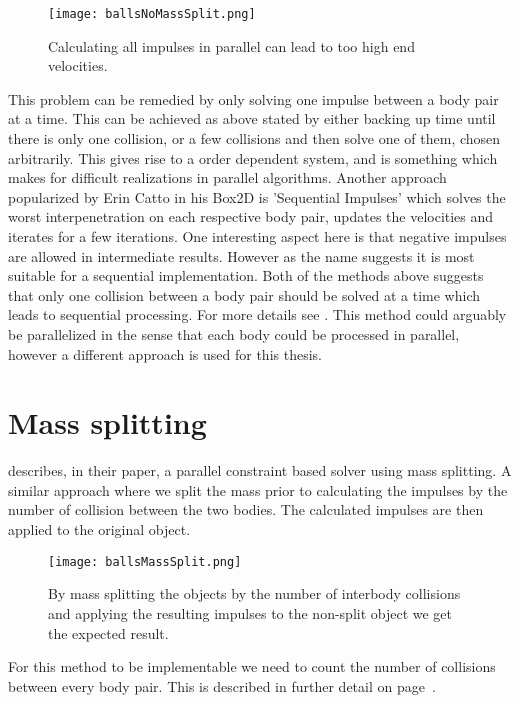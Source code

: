 \begin{figure}[H]
  \centering
  \texttt{[image: ballsNoMassSplit.png]}
  \caption{Calculating all impulses in parallel can lead to too high end velocities.}
  \label{fig:noSplit}
\end{figure}

This problem can be remedied by only solving one impulse between a body pair at a time.
This can be achieved as above stated by either backing up time until there
is only one collision, or a few collisions and then solve one of them, chosen
arbitrarily. This gives rise to a order dependent system, and is something which
makes for difficult realizations in parallel algorithms. Another approach popularized
by Erin Catto in his Box2D is 'Sequential Impulses' which solves the worst interpenetration
on each respective body pair, updates the velocities and iterates for a few iterations.
One interesting aspect here is that negative impulses are allowed in intermediate
results. However as the name suggests it is most suitable for a sequential implementation.
Both of the methods above suggests that only one collision between a body pair should
be solved at a time which leads to sequential processing. For more details see \cite{catto}.
This method could arguably be parallelized in the sense that each body could be
processed in parallel, however a different approach is used for this thesis.

\section{Mass splitting}\label{sec:massSplit}
\cite{tonge} describes, in their paper, a parallel constraint based solver
using mass splitting. A similar approach where we split the mass prior to
calculating the impulses by the number of collision between the two bodies. The
calculated impulses are then applied to the original object.

\begin{figure}[H]
  \centering
  \texttt{[image: ballsMassSplit.png]}
  \caption{By mass splitting the objects by the number of interbody collisions
  and applying the resulting impulses to the non-split object we get the expected result.}
  \label{fig:massSplit}
\end{figure}

For this method to be implementable we need to count the number of collisions between
every body pair. This is described in further detail on page~\pageref{sec:colMatrix}.

